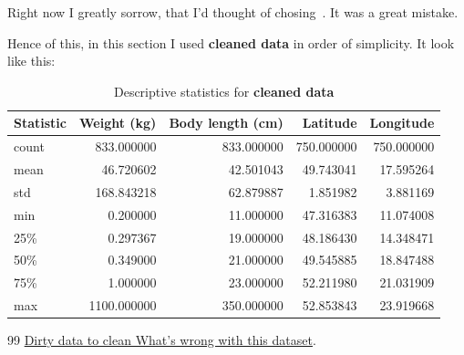 \documentclass{article} %
\begin{document}
Right now I greatly sorrow, that I'd thought of chosing~\cite{data_link}. It was a great mistake.

Hence of this, in this section I used \textbf{cleaned data} in order of
simplicity. It look like this:

\begin{table}[h]
\centering
\begin{tabular}{lrrrr}
\hline
Statistic & Weight (kg) & Body length (cm) & Latitude & Longitude \\
\hline
count & 833.000000 & 833.000000 & 750.000000 & 750.000000 \\
mean  & 46.720602  & 42.501043  & 49.743041  & 17.595264  \\
std   & 168.843218 & 62.879887  & 1.851982   & 3.881169   \\
min   & 0.200000   & 11.000000  & 47.316383  & 11.074008  \\
25\%  & 0.297367   & 19.000000  & 48.186430  & 14.348471  \\
50\%  & 0.349000   & 21.000000  & 49.545885  & 18.847488  \\
75\%  & 1.000000   & 23.000000  & 52.211980  & 21.031909  \\
max   & 1100.000000 & 350.000000 & 52.853843  & 23.919668  \\
\hline
\end{tabular}
\caption{Descriptive statistics for \textbf{cleaned data}}
\end{table}

\begin{thebibliography}{99}
 \href{https://www.kaggle.com/datasets/joannanplkrk/dirty-data-to-clean-whats-wrong-with-this-dataset}{Dirty data to clean What's wrong with this dataset}.
\end{thebibliography}
\end{document}
